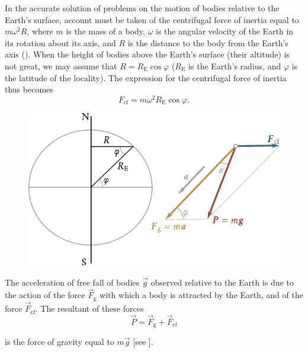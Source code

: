 In the accurate solution of problems on the motion of bodies relative to the Earth's surface, account must be taken of the centrifugal force of inertia equal to $m\omega^2R$, where $m$ is the mass of a body, $\omega$ is the angular velocity of the Earth in its rotation about its axis, and $R$ is the distance to the body from the Earth's axis (). When the height of bodies above the Earth's surface (their altitude) is not great, we may assume that $R=R_{\text{E}}\cos\varphi$ ($R_{\text{E}}$ is the Earth's radius, and $\varphi$ is the latitude of the locality). The expression for the centrifugal force of inertia thus becomes
\begin{equation}\label{eq:4_7}
F_{\text{cf}} = m\omega^2 R_{\text{E}}\cos\varphi.
\end{equation}

\begin{figure}[t]
	\begin{center}
		\includegraphics[scale=1]{figures/ch_04/fig_4_5.pdf}
		\caption[]{}
		\label{fig:4_5}
	\end{center}
	\vspace{-0.8cm}
\end{figure}

The acceleration of free fall of bodies $\vec{g}$ observed relative to the Earth is due to the action of the force $\vec{F}_{\text{g}}$ with which a body is attracted by the Earth, and of the force $\vec{F}_{\text{cf}}$. The resultant of these forces
\begin{equation}\label{eq:4_8}
\vec{P} = \vec{F}_{\text{g}} + \vec{F}_{\text{cf}}
\end{equation}

\noindent
is the force of gravity equal to $m\vec{g}$ [see ].

